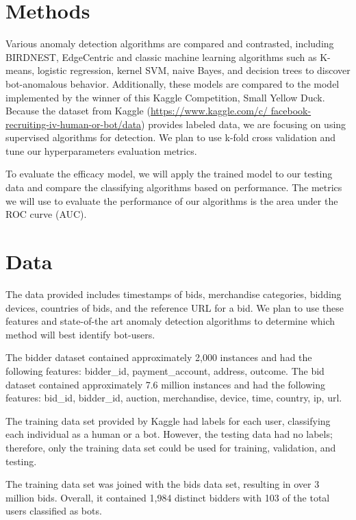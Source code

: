 \documentclass{article} %
\begin{document}
\section{Methods}

Various anomaly detection algorithms are compared and contrasted, including BIRDNEST, EdgeCentric and classic machine learning algorithms such as K-means, logistic regression, kernel SVM, naive Bayes, and decision trees to discover bot-anomalous behavior.
Additionally, these models are compared to the model implemented by the winner of this Kaggle Competition, Small Yellow Duck.
Because the dataset from Kaggle (\url{https://www.kaggle.com/c/ facebook-recruiting-iv-human-or-bot/data}) provides labeled data, we are focusing on using supervised algorithms for detection.
We plan to use k-fold cross validation and tune our hyperparameters evaluation metrics. 

To evaluate the efficacy model, we will apply the trained model to our testing data and compare the classifying algorithms based on performance.
The metrics we will use to evaluate the performance of our algorithms is the area under the ROC curve (AUC). 

\section{Data}

The data provided includes timestamps of bids, merchandise categories, bidding devices, countries of bids, and the reference URL for a bid.
We plan to use these features and state-of-the art anomaly detection algorithms to determine which method will best identify bot-users.

The bidder dataset contained approximately 2,000 instances and had the following features: bidder\_id, payment\_account, address, outcome.
The bid dataset contained approximately 7.6 million instances and had the following features: bid\_id, bidder\_id, auction, merchandise, device, time, country, ip, url.

The training data set provided by Kaggle had labels for each user, classifying each individual as a human or a bot.
However, the testing data had no labels; therefore, only the training data set could be used for training, validation, and testing.

The training data set was joined with the bids data set, resulting in over 3 million bids.
Overall, it contained 1,984 distinct bidders with 103 of the total users classified as bots.
\end{document}
